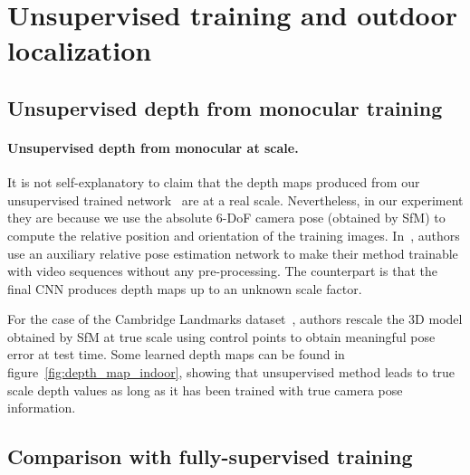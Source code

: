 \section{Unsupervised training and outdoor localization}
\label{subseq:outdoor}
\subsection{Unsupervised depth from monocular training}

\paragraph{Unsupervised depth from monocular at scale.} It is not self-explanatory to claim that the depth maps produced from our unsupervised trained network~\citep{Zhou2017a} are at a real scale. Nevertheless, in our experiment they are because we use the absolute 6-DoF camera pose (obtained by SfM) to compute the relative position and orientation of the training images. In~\citep{Zhou2017a}, authors use an auxiliary relative pose estimation network to make their method trainable with video sequences without any pre-processing. The counterpart is that the final CNN produces depth maps up to an unknown scale factor.

For the case of the Cambridge Landmarks dataset~\citep{Kendall2015}, authors rescale the 3D model obtained by SfM at true scale using control points to obtain meaningful pose error at test time. Some learned depth maps can be found in figure~\ref{fig:depth_map_indoor}, showing that unsupervised method leads to true scale depth values as long as it has been trained with true camera pose information.

\subsection{Comparison with fully-supervised training}



